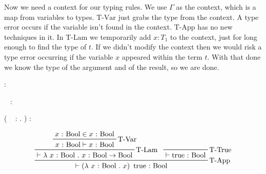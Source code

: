 \begin{frame}
\begin{mdframed}[frametitle={Typing rules}]
\begin{overprint}
\end{overprint}
\end{mdframed}
\medskip
\begin{overprint}
 Now we need a context for our typing rules.
 We use $\Gamma$ as the context, which is a map from variables to types.
 $\text{T-Var}$ just grabs the type from the context.
 A type error occurs if the variable isn't found in the context.
 $\text{T-App}$ has no new techniques in it.
 In $\text{T-Lam}$ we temporarily add $x {:} T_1$ to the context, just for long enough to find the type of $t$.
 If we didn't modify the context then we would risk a type error occurring if the variable $x$ appeared within the term $t$.
 With that done we know the type of the argument and of the result, so we are done.
\end{overprint}
\end{frame}

\begin{frame}[c]
  \begin{mdframed}[frametitle={Typing rules}]

  { \highlight[white]{\Gamma} \vdash
     {:}
  }

  { \highlight[white]{\Gamma} \vdash
     ~
     {:}
  }

  { \highlight[white]{\Gamma} \vdash
    \left(
      \lambda~
       {:}
       .
    \right) {:}
     \rightarrow
  }
  \end{mdframed}

  \begin{displaymath}
    \prftree[r]{T-App}
    {\prftree[r]{T-Lam}
      {\prftree[r]{T-Var}
        {x~{:}~\text{Bool} \in x~{:}~\text{Bool}}
        {x~{:}~\text{Bool} \vdash x~{:}~\text{Bool}}}
      {\vdash \lambda~x~{:}~\text{Bool}~.~x~{:}~\text{Bool} \rightarrow \text{Bool}}}
    {\prftree[r]{T-True}
      {}
      {\vdash \text{true}~{:}~\text{Bool}}}
    {\vdash \left(\lambda~x~{:}~\text{Bool}~.~x\right)~\text{true}~{:}~\text{Bool}}
  \end{displaymath}
\end{frame}

